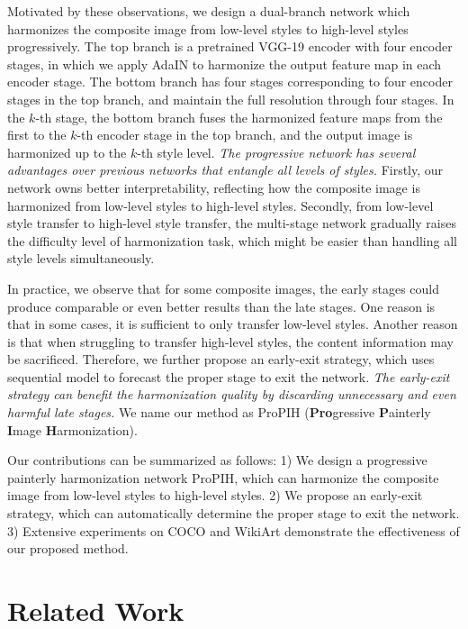 \documentclass[letterpaper]{article} %
\begin{document}
Motivated by these observations, we design a dual-branch network which harmonizes the composite image from low-level styles to high-level styles progressively. The top branch is a pretrained VGG-19 \cite{VGG19} encoder with four encoder stages, in which we apply AdaIN \cite{huang2017arbitrary} to harmonize the output feature map in each encoder stage. The bottom branch has four stages corresponding to four encoder stages in the top branch, and maintain the full resolution through four stages.  In the $k$-th stage, the bottom branch fuses the harmonized feature maps from the first to the $k$-th encoder stage in the top branch, and the output image is harmonized up to the $k$-th style level. \emph{The progressive network has several advantages over previous networks that entangle all levels of styles.} Firstly, our network owns better interpretability, reflecting how the composite image is harmonized from low-level styles to high-level styles. Secondly, from low-level style transfer to high-level style transfer, the multi-stage network gradually raises the difficulty level of harmonization task, which might be easier than handling all style levels simultaneously.

In practice, we observe that for some composite images, the early stages could produce comparable or even better results than the late stages.  One reason is that in some cases, it is sufficient to only transfer low-level styles. Another reason is that when struggling to transfer high-level styles, the content information may be sacrificed.  Therefore, we further propose an early-exit strategy, which uses sequential model  to forecast the proper stage to exit the network. \emph{The early-exit strategy can benefit the harmonization quality by discarding unnecessary and even harmful late stages.} We name our method as ProPIH (\textbf{Pro}gressive \textbf{P}ainterly \textbf{I}mage \textbf{H}armonization).


Our contributions can be summarized as follows: 1) We design a progressive painterly harmonization network ProPIH, which can harmonize the composite image from low-level styles to high-level styles. 2) We propose an early-exit strategy, which can automatically determine the proper stage to exit the network. 3) Extensive experiments on COCO \cite{lin2014microsoft} and WikiArt \cite{nichol2016painter} demonstrate the effectiveness of our proposed method. 


\section{Related Work}
\end{document}
